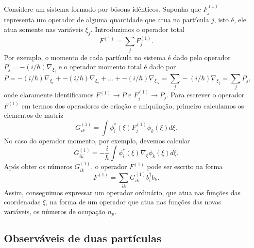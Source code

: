 \documentclass{article}
\begin{document}
Considere um sistema formado por bósons idênticos. Suponha que $F_j^{(1)}$ representa um operador de alguma quantidade que atua na partícula $j$, isto é, ele atua somente nas variáveis $\xi_j$. Introduzimos o operador total
\begin{equation}
    F^{(1)} = \sum_j F_j^{(1)}.
\end{equation}
Por exemplo, o momento de cada partícula no sistema é dado pelo operador $P_j = -(i/\hbar)\nabla_{\xi_j}$ e o operador momento total é dado por
\begin{equation}
    P = -(i/\hbar)\nabla_{\xi_1} + -(i/\hbar)\nabla_{\xi_2} + ... + -(i/\hbar)\nabla_{\xi_N} = \sum_j -(i/\hbar)\nabla_{\xi_j} = \sum_j P_j,
\end{equation}
onde claramente identificamos $F^{(1)} \rightarrow P$ e $F_j^{(1)} \rightarrow P_j$. Para escrever o operador $F^{(1)}$ em termos dos operadores de criação e aniquilação, primeiro calculamos os elementos de matriz
\begin{equation}
    G_{ik}^{(1)} = \int \phi_i^{*}(\xi)F_j^{(1)}\phi_k(\xi)d\xi.
\end{equation}
No caso do operador momento, por exemplo, devemos calcular
\begin{equation}
    G_{ik}^{(1)} = -\frac{i}{\hbar}\int \phi_i^{*}(\xi)\nabla_{\xi}\phi_k(\xi)d\xi.
\end{equation}
Após obter os números $G_{ik}^{(1)}$, o operador $F^{(1)}$ pode ser escrito na forma
\begin{equation}
    F^{(1)} = \sum_{ik}G_{ik}^{(1)}b_i^\dagger b_k.
    \label{eq26}
\end{equation}
Assim, conseguimos expressar um operador ordinário, que atua nas funções das coordenadas $\xi$, na forma de um operador que atua nas funções das novas variáveis, os números de ocupação $n_p$. 

\subsection{Observáveis de duas partículas}
\end{document}
